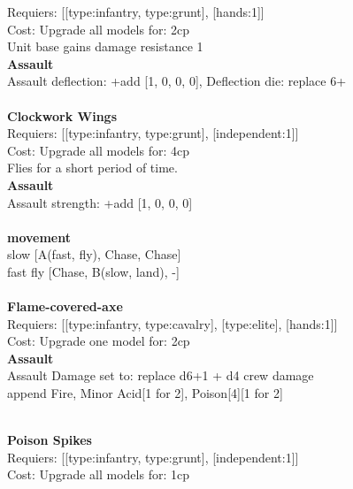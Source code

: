 Requiers: [[type:infantry, type:grunt], [hands:1]] \\
Cost: Upgrade all models for: 2cp \\
Unit base gains damage resistance 1\\ 




{\bf Assault} \ \\
Assault deflection: +add [1, 0, 0, 0], Deflection die: replace 6+
\\ 




\ \\
{\bf Clockwork Wings } \\

Requiers: [[type:infantry, type:grunt], [independent:1]] \\
Cost: Upgrade all models for: 4cp \\
Flies for a short period of time.\\ 




{\bf Assault} \ \\
Assault strength: +add [1, 0, 0, 0] 
\\ 



\ \\ {\bf movement } \\
slow [A(fast, fly), Chase, Chase] \\
fast fly [Chase, B(slow, land), -] \\

\ \\
{\bf Flame-covered-axe } \\

Requiers: [[type:infantry, type:cavalry], [type:elite], [hands:1]] \\
Cost: Upgrade one model for: 2cp \\




{\bf Assault} \ \\
Assault Damage set to: replace d6+1 + d4 crew damage
\\ 

append Fire, Minor Acid[1 for 2], Poison[4][1 for 2]


\ \\
{\bf Poison Spikes } \\

Requiers: [[type:infantry, type:grunt], [independent:1]] \\
Cost: Upgrade all models for: 1cp \\




